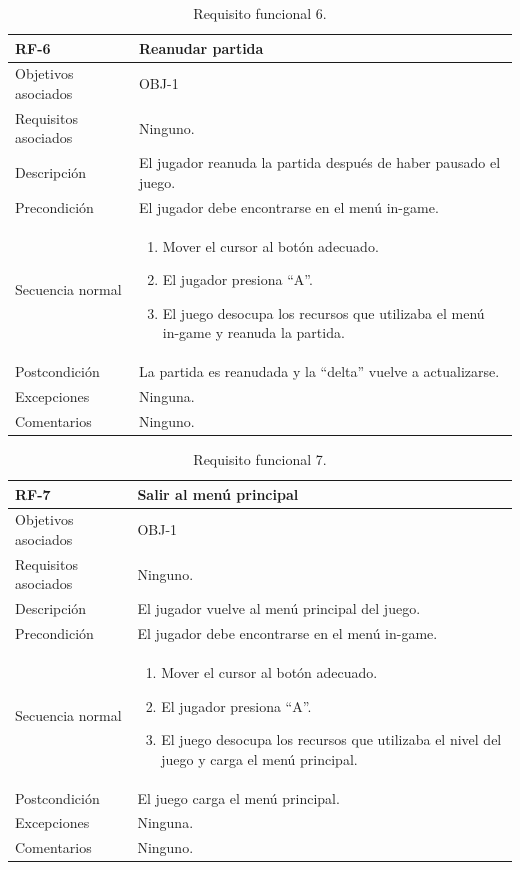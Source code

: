 \begin{table}[h]
	\centering
	\begin{tabular}{| l | p{11cm} |}
		\hline
		\textbf{RF-6} & \textbf{Reanudar partida} \\ \hline
		Objetivos asociados & OBJ-1 \\ \hline
		Requisitos asociados & Ninguno. \\ \hline
		Descripción & El jugador reanuda la partida después de haber pausado el juego. \\ \hline
		Precondición & El jugador debe encontrarse en el menú in-game.  \\ \hline
		Secuencia normal & 
		\begin{enumerate}
			\item Mover el cursor al botón adecuado.
			\item El jugador presiona ``A''.
			\item El juego desocupa los recursos que utilizaba el menú in-game y reanuda la partida.
		\end{enumerate}
		\\ \hline
		Postcondición & La partida es reanudada y la ``delta'' vuelve a actualizarse. \\ \hline
		Excepciones & Ninguna. \\ \hline
		Comentarios & Ninguno. \\ \hline
	\end{tabular}
	\caption{Requisito funcional 6.}\label{tab:rf-6}
\end{table}
\FloatBarrier{}

\begin{table}[h]
	\centering
	\begin{tabular}{| l | p{11cm} |}
		\hline
		\textbf{RF-7} & \textbf{Salir al menú principal} \\ \hline
		Objetivos asociados & OBJ-1 \\ \hline
		Requisitos asociados & Ninguno. \\ \hline
		Descripción & El jugador vuelve al menú principal del juego. \\ \hline
		Precondición & El jugador debe encontrarse en el menú in-game.  \\ \hline
		Secuencia normal & 
		\begin{enumerate}
			\item Mover el cursor al botón adecuado.
			\item El jugador presiona ``A''.
			\item El juego desocupa los recursos que utilizaba el nivel del juego y carga el menú principal.
		\end{enumerate}
		\\ \hline
		Postcondición & El juego carga el menú principal. \\ \hline
		Excepciones & Ninguna. \\ \hline
		Comentarios & Ninguno. \\ \hline
	\end{tabular}
	\caption{Requisito funcional 7.}\label{tab:rf-7}
\end{table}

